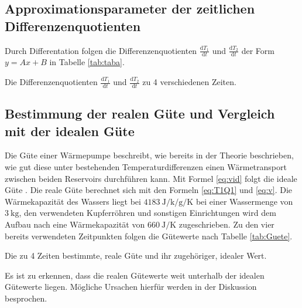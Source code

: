 \subsection{Approximationsparameter der zeitlichen Differenzenquotienten}

Durch Differentation folgen die Differenzenquotienten
$\frac{\text{d}T_1}{\text{d}t}$ und $\frac{\text{d}T_2}{\text{d}t}$ der Form $y = Ax+B$ in Tabelle \ref{tab:taba}.

\begin{table}
  \centering
  \caption{Die Differenzenquotienten $\frac{\text{d}T_1}{\text{d}t}$ und $\frac{\text{d}T_2}{\text{d}t}$ zu 4 verschiedenen Zeiten.}
  \label{tab:Ableitungen}
\end{table}

\subsection{Bestimmung der realen Güte und Vergleich mit der idealen Güte}
Die Güte einer Wärmepumpe beschreibt, wie bereits in der Theorie beschrieben,
wie gut diese unter bestehenden Temperaturdifferenzen einen Wärmetransport zwischen
beiden Reservoirs durchführen kann. Mit Formel \ref{eq:vid} folgt die ideale Güte . Die
reale Güte berechnet sich mit den Formeln \ref{eq:T1Q1} und \ref{eq:v}. Die Wärmekapazität des Wassers
liegt bei $\SI{4183}{\joule\per\kilo\per\gram\per\kelvin}$ \cite{cw} bei einer Wassermenge von $\SI{3}{\kilo\gram}$, den verwendeten
Kupferröhren und sonstigen Einrichtungen wird dem Aufbau \cite{V206} nach eine Wärmekapazität von $\SI{660}{\joule\per\kelvin}$ zugeschrieben.
Zu den vier bereits verwendeten Zeitpunkten folgen die Gütewerte nach Tabelle \ref{tab:Guete}.

\begin{table}
  \centering
  \caption{Die zu 4 Zeiten bestimmte, reale Güte und ihr zugehöriger, idealer Wert.}
  \label{tab:Guete}
\end{table}

Es ist zu erkennen, dass die realen Gütewerte weit unterhalb der idealen Gütewerte liegen.
Mögliche Ursachen hierfür werden in der Diskussion besprochen.

